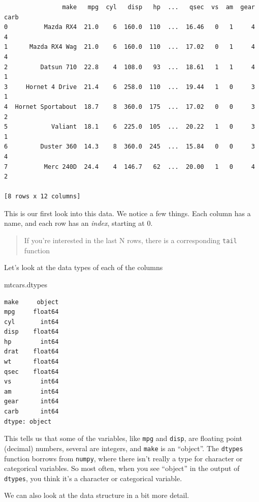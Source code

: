 \documentclass[
  letterpaper,
]{scrbook}
\newenvironment{Shaded}{\begin{snugshade}}{\end{snugshade}}
\newcommand{\NormalTok}[1]{#1}
\begin{document}
\begin{verbatim}
                make   mpg  cyl   disp   hp  ...   qsec  vs  am  gear  carb
0          Mazda RX4  21.0    6  160.0  110  ...  16.46   0   1     4     4
1      Mazda RX4 Wag  21.0    6  160.0  110  ...  17.02   0   1     4     4
2         Datsun 710  22.8    4  108.0   93  ...  18.61   1   1     4     1
3     Hornet 4 Drive  21.4    6  258.0  110  ...  19.44   1   0     3     1
4  Hornet Sportabout  18.7    8  360.0  175  ...  17.02   0   0     3     2
5            Valiant  18.1    6  225.0  105  ...  20.22   1   0     3     1
6         Duster 360  14.3    8  360.0  245  ...  15.84   0   0     3     4
7          Merc 240D  24.4    4  146.7   62  ...  20.00   1   0     4     2

[8 rows x 12 columns]
\end{verbatim}

This is our first look into this data. We notice a few things. Each column has a name, and each row has an \emph{index}, starting at 0.

\begin{quote}
If you're interested in the last N rows, there is a corresponding \texttt{tail} function
\end{quote}

Let's look at the data types of each of the columns

\begin{Shaded}
\begin{Highlighting}[]
\NormalTok{mtcars.dtypes}
\end{Highlighting}
\end{Shaded}

\begin{verbatim}
make     object
mpg     float64
cyl       int64
disp    float64
hp        int64
drat    float64
wt      float64
qsec    float64
vs        int64
am        int64
gear      int64
carb      int64
dtype: object
\end{verbatim}

This tells us that some of the variables, like \texttt{mpg} and \texttt{disp}, are floating point (decimal) numbers, several are integers, and \texttt{make} is an ``object''. The \texttt{dtypes} function borrows from \texttt{numpy}, where there isn't really a type for character or categorical variables. So most often, when you see ``object'' in the output of \texttt{dtypes}, you think it's a character or categorical variable.

We can also look at the data structure in a bit more detail.
\end{document}
